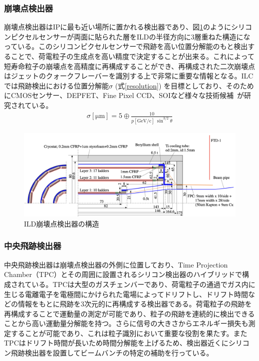 \subsubsection{崩壊点検出器}
崩壊点検出器はIPに最も近い場所に置かれる検出器であり、図\ref{vertexdetector}のようにシリコンピクセルセンサーが両面に貼られた層をILDの半径方向に3層重ねた構造になっている。このシリコンピクセルセンサーで飛跡を高い位置分解能のもと検出することで、荷電粒子の生成点を高い精度で決定することが出来る。これによって短寿命粒子の崩壊点を高精度に再構成することができ、再構成された二次崩壊点はジェットのクォークフレーバーを識別する上で非常に重要な情報となる。ILCでは飛跡検出における位置分解能$\sigma$ (式\ref{resolution}) を目標としており、そのためにCMOSセンサー、DEPFET、Fine Pixel CCD、SOIなど様々な技術候補~\cite{tdr2}が研究されている。
\begin{align}
\label{resolution}
\sigma [\mathrm{\mu m}] = 5 \oplus \frac{10} {p[\mathrm{GeV/c}] \ {\sin^{3/2}{\theta}}}
\end{align}
\begin{figure}[H]
	\begin{center}
 \includegraphics[keepaspectratio, scale=0.3]
 	{Figure/Introduction/vertexdetector.png}
 		\caption {ILD崩壊点検出器の構造~\cite{tdr2}}
 		\label{vertexdetector}
	\end{center}
\end{figure}
\subsubsection{中央飛跡検出器}
中央飛跡検出器は崩壊点検出器の外側に位置しており、Time Projection Chamber（TPC）とその周囲に設置されるシリコン検出器のハイブリッドで構成されている。TPCは大型のガスチェンバーであり、荷電粒子の通過でガス内に生じる電離電子を電極間にかけられた電場によってドリフトし、ドリフト時間などの情報をもとに飛跡を3次元的に再構成する検出器である。荷電粒子の飛跡を再構成することで運動量の測定が可能であり、粒子の飛跡を連続的に検出できることから高い運動量分解能を持つ。さらに信号の大きさからエネルギー損失も測定することが可能であり、これは粒子識別において重要な役割を果たす。またTPCはドリフト時間が長いため時間分解能を上げるため、検出器近くにシリコン飛跡検出器を設置してビームバンチの特定の補助を行っている。
